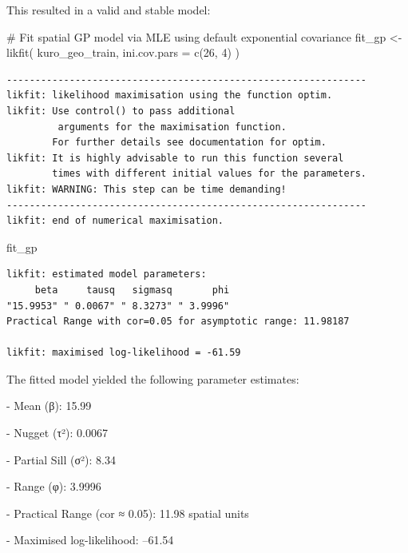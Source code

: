 \documentclass[
  11pt,
]{article}
\newenvironment{Shaded}{\begin{snugshade}}{\end{snugshade}}
\newcommand{\AttributeTok}[1]{\textcolor[rgb]{0.40,0.45,0.13}{#1}}
\newcommand{\CommentTok}[1]{\textcolor[rgb]{0.37,0.37,0.37}{#1}}
\newcommand{\DecValTok}[1]{\textcolor[rgb]{0.68,0.00,0.00}{#1}}
\newcommand{\FunctionTok}[1]{\textcolor[rgb]{0.28,0.35,0.67}{#1}}
\newcommand{\NormalTok}[1]{\textcolor[rgb]{0.00,0.23,0.31}{#1}}
\newcommand{\OtherTok}[1]{\textcolor[rgb]{0.00,0.23,0.31}{#1}}
\begin{document}
This resulted in a valid and stable model:

\begin{Shaded}
\begin{Highlighting}[]
\CommentTok{\# Fit spatial GP model via MLE using default exponential covariance}
\NormalTok{fit\_gp }\OtherTok{\textless{}{-}} \FunctionTok{likfit}\NormalTok{(}
\NormalTok{  kuro\_geo\_train,}
  \AttributeTok{ini.cov.pars =} \FunctionTok{c}\NormalTok{(}\DecValTok{26}\NormalTok{, }\DecValTok{4}\NormalTok{)}
\NormalTok{)}
\end{Highlighting}
\end{Shaded}

\begin{verbatim}
---------------------------------------------------------------
likfit: likelihood maximisation using the function optim.
likfit: Use control() to pass additional
         arguments for the maximisation function.
        For further details see documentation for optim.
likfit: It is highly advisable to run this function several
        times with different initial values for the parameters.
likfit: WARNING: This step can be time demanding!
---------------------------------------------------------------
likfit: end of numerical maximisation.
\end{verbatim}

\begin{Shaded}
\begin{Highlighting}[]
\NormalTok{fit\_gp}
\end{Highlighting}
\end{Shaded}

\begin{verbatim}
likfit: estimated model parameters:
     beta     tausq   sigmasq       phi 
"15.9953" " 0.0067" " 8.3273" " 3.9996" 
Practical Range with cor=0.05 for asymptotic range: 11.98187

likfit: maximised log-likelihood = -61.59
\end{verbatim}

The fitted model yielded the following parameter estimates:

- Mean (β): 15.99

- Nugget (τ²): 0.0067

- Partial Sill (σ²): 8.34

- Range (φ): 3.9996

- Practical Range (cor ≈ 0.05): 11.98 spatial units

- Maximised log-likelihood: --61.54
\end{document}
